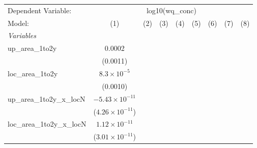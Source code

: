 
\begingroup
\centering
\begin{tabular}{lcccccccc}
   \tabularnewline \midrule \midrule
   Dependent Variable: & \multicolumn{8}{c}{log10(wq\_conc)}\\
   Model:                        & (1)                      & (2)                      & (3)                           & (4)                           & (5)                         & (6)                      & (7)                      & (8)\\  
   \midrule
   \emph{Variables}\\
   up\_area\_1to2y               & 0.0002                   &                          &                               &                               &                             &                          &                          &   \\   
                                 & (0.0011)                 &                          &                               &                               &                             &                          &                          &   \\   
   loc\_area\_1to2y              & $8.3\times 10^{-5}$      &                          &                               &                               &                             &                          &                          &   \\   
                                 & (0.0010)                 &                          &                               &                               &                             &                          &                          &   \\   
   up\_area\_1to2y\_x\_locN      & $-5.43\times 10^{-11}$   &                          &                               &                               &                             &                          &                          &   \\   
                                 & ($4.26\times 10^{-11}$)  &                          &                               &                               &                             &                          &                          &   \\   
   loc\_area\_1to2y\_x\_locN     & $1.12\times 10^{-11}$    &                          &                               &                               &                             &                          &                          &   \\   
                                 & ($3.01\times 10^{-11}$)  &                          &                               &                               &                             &                          &                          &   \\   

\end{tabular}
